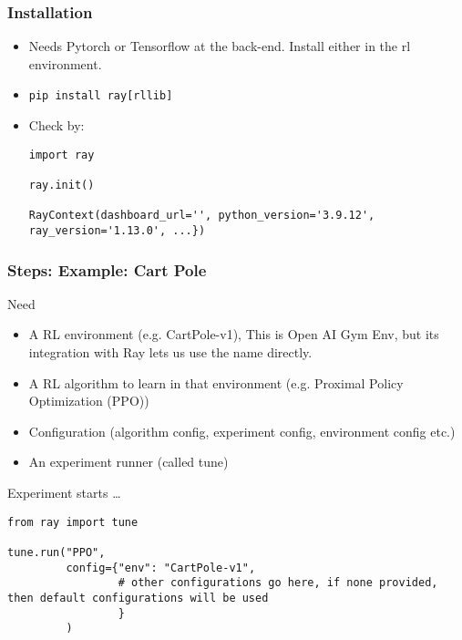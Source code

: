 \begin{frame}[fragile]\frametitle{Installation}
\begin{itemize}
\item Needs Pytorch or Tensorflow at the back-end. Install either in the rl environment.
\item \lstinline|pip install ray[rllib]|
\item  Check by:

\begin{lstlisting}
import ray

ray.init()

RayContext(dashboard_url='', python_version='3.9.12', ray_version='1.13.0', ...})
\end{lstlisting}
\end{itemize}
\end{frame}

\begin{frame}[fragile]\frametitle{Steps: Example: Cart Pole}
Need 
\begin{itemize}
\item A RL environment (e.g. CartPole-v1), This is Open AI Gym Env, but its integration with Ray lets us use the name directly.
\item A RL algorithm to learn in that environment (e.g. Proximal Policy Optimization (PPO))
\item Configuration (algorithm config, experiment config, environment config etc.)
\item An experiment runner (called tune)
\end{itemize}

Experiment starts \ldots

\begin{lstlisting}
from ray import tune

tune.run("PPO",
         config={"env": "CartPole-v1",
                 # other configurations go here, if none provided, then default configurations will be used
                 }
         )
\end{lstlisting}

% 
\end{frame}

